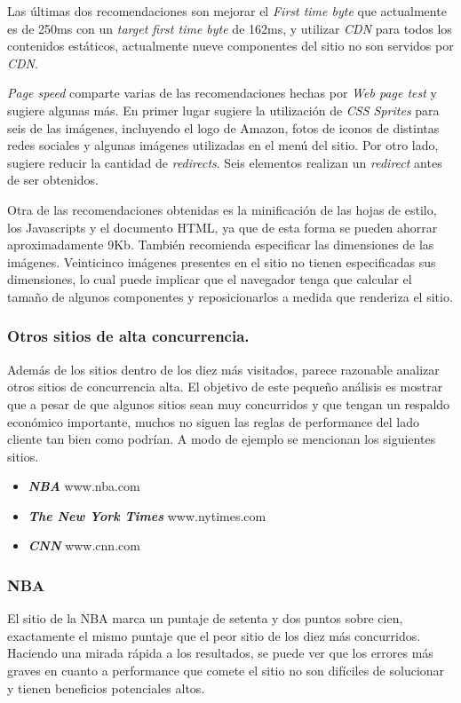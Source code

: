 Las últimas dos recomendaciones son mejorar el \emph{First time byte} que actualmente es de 250ms con un \emph{target first time byte} de 162ms, y utilizar \emph{CDN} para todos los contenidos estáticos, actualmente nueve componentes del sitio no son servidos por \emph{CDN}.

\emph{Page speed} comparte varias de las recomendaciones hechas por \emph{Web page test} y sugiere algunas más. En primer lugar sugiere la utilización de \emph{CSS Sprites}
para seis de las imágenes, incluyendo el logo de Amazon, fotos de iconos de distintas redes sociales y algunas imágenes utilizadas en el menú del sitio.
Por otro lado, sugiere reducir la cantidad de \emph{redirects}. Seis elementos realizan un \emph{redirect} antes de ser obtenidos.

Otra de las recomendaciones obtenidas es la minificación de las hojas de estilo, los Javascripts y el documento HTML, ya que de esta forma se pueden ahorrar aproximadamente 9Kb.
También recomienda especificar las dimensiones de las imágenes. Veinticinco imágenes presentes en el sitio no tienen especificadas sus dimensiones, lo cual puede implicar
que el navegador tenga que calcular el tamaño de algunos componentes y reposicionarlos a medida que renderiza el sitio.

\subsubsection{Otros sitios de alta concurrencia.}

Además de los sitios dentro de los diez más visitados, parece razonable analizar otros sitios de concurrencia alta. El objetivo de este pequeño análisis es mostrar que a pesar de que
algunos sitios sean muy concurridos y que tengan un respaldo económico importante, muchos no siguen las reglas de performance del lado cliente tan bien como podrían.
A modo de ejemplo se mencionan los siguientes sitios.

\begin{itemize}
	\item
	\textbf{\emph{NBA}} www.nba.com
	\item
	\textbf{\emph{The New York Times}} www.nytimes.com
	\item
	\textbf{\emph{CNN}} www.cnn.com
\end{itemize}

\subsubsection{NBA}
El sitio de la NBA marca un puntaje de setenta y dos puntos sobre cien, exactamente el mismo puntaje que el peor sitio de los diez más concurridos. Haciendo una mirada rápida a los
resultados, se puede ver que los errores más graves en cuanto a performance que comete el sitio no son difíciles de solucionar y tienen beneficios potenciales altos.

